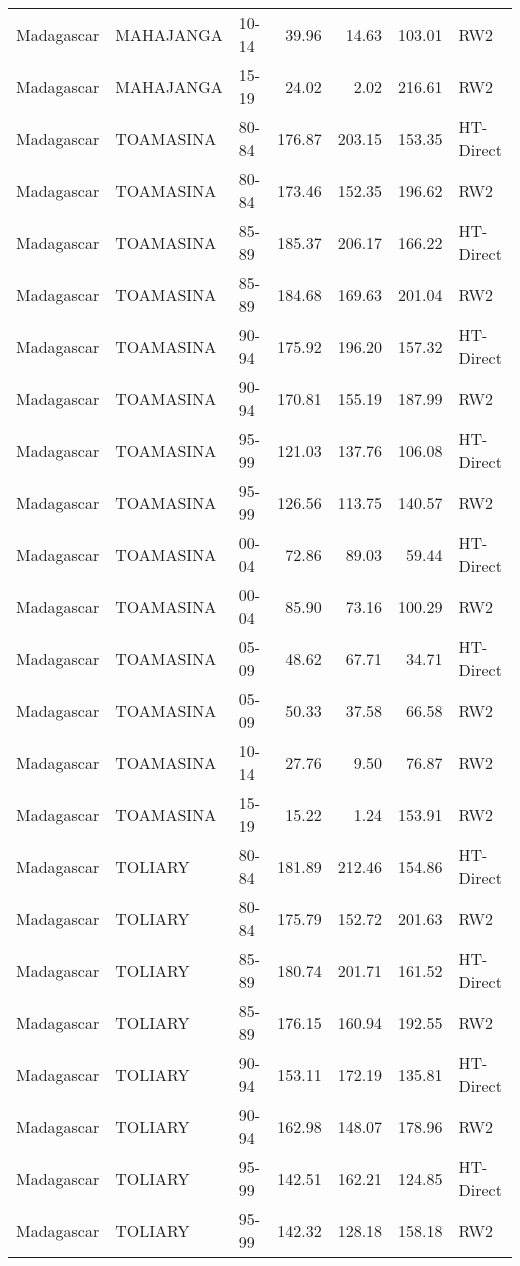 \begin{longtable}{lllrrrl}
  Madagascar & MAHAJANGA & 10-14 & 39.96 & 14.63 & 103.01 & RW2 \\ 
  Madagascar & MAHAJANGA & 15-19 & 24.02 & 2.02 & 216.61 & RW2 \\ 
  Madagascar & TOAMASINA & 80-84 & 176.87 & 203.15 & 153.35 & HT-Direct \\ 
  Madagascar & TOAMASINA & 80-84 & 173.46 & 152.35 & 196.62 & RW2 \\ 
  Madagascar & TOAMASINA & 85-89 & 185.37 & 206.17 & 166.22 & HT-Direct \\ 
  Madagascar & TOAMASINA & 85-89 & 184.68 & 169.63 & 201.04 & RW2 \\ 
  Madagascar & TOAMASINA & 90-94 & 175.92 & 196.20 & 157.32 & HT-Direct \\ 
  Madagascar & TOAMASINA & 90-94 & 170.81 & 155.19 & 187.99 & RW2 \\ 
  Madagascar & TOAMASINA & 95-99 & 121.03 & 137.76 & 106.08 & HT-Direct \\ 
  Madagascar & TOAMASINA & 95-99 & 126.56 & 113.75 & 140.57 & RW2 \\ 
  Madagascar & TOAMASINA & 00-04 & 72.86 & 89.03 & 59.44 & HT-Direct \\ 
  Madagascar & TOAMASINA & 00-04 & 85.90 & 73.16 & 100.29 & RW2 \\ 
  Madagascar & TOAMASINA & 05-09 & 48.62 & 67.71 & 34.71 & HT-Direct \\ 
  Madagascar & TOAMASINA & 05-09 & 50.33 & 37.58 & 66.58 & RW2 \\ 
  Madagascar & TOAMASINA & 10-14 & 27.76 & 9.50 & 76.87 & RW2 \\ 
  Madagascar & TOAMASINA & 15-19 & 15.22 & 1.24 & 153.91 & RW2 \\ 
  Madagascar & TOLIARY & 80-84 & 181.89 & 212.46 & 154.86 & HT-Direct \\ 
  Madagascar & TOLIARY & 80-84 & 175.79 & 152.72 & 201.63 & RW2 \\ 
  Madagascar & TOLIARY & 85-89 & 180.74 & 201.71 & 161.52 & HT-Direct \\ 
  Madagascar & TOLIARY & 85-89 & 176.15 & 160.94 & 192.55 & RW2 \\ 
  Madagascar & TOLIARY & 90-94 & 153.11 & 172.19 & 135.81 & HT-Direct \\ 
  Madagascar & TOLIARY & 90-94 & 162.98 & 148.07 & 178.96 & RW2 \\ 
  Madagascar & TOLIARY & 95-99 & 142.51 & 162.21 & 124.85 & HT-Direct \\ 
  Madagascar & TOLIARY & 95-99 & 142.32 & 128.18 & 158.18 & RW2 \\ 

\end{longtable}

